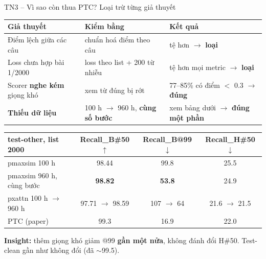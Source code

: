 \documentclass[aspectratio=169,xcolor=table]{beamer}
\newcommand{\bad}[1]{\textcolor{RiskRed}{\textbf{#1}}}
\newcommand{\good}[1]{\textcolor{GoodGreen}{\textbf{#1}}}
\newcommand{\ra}{$\rightarrow$}
\begin{document}
\begin{frame}{TN3 -- Vì sao còn thua PTC? Loại trừ từng giả thuyết}
\centering\footnotesize
\begin{tabular}{p{3.8cm}p{4.3cm}p{4.9cm}}
\toprule
Giả thuyết & Kiểm bằng & Kết quả\\
\midrule
Điểm lệch giữa các câu & chuẩn hoá điểm theo câu & tệ hơn \ra{} \bad{loại}\\
Loss chưa hợp bài 1/2000 & loss theo list + 200 từ nhiễu & tệ hơn mọi metric \ra{} \bad{loại}\\
Scorer \textbf{nghe kém} giọng khó & xem từ đúng bị rớt & 77--85\% có điểm $<$ 0.3 \ra{} \good{đúng}\\
\textbf{Thiếu dữ liệu} & 100 h \ra{} 960 h, \textbf{cùng số bước} & xem bảng dưới \ra{} \good{đúng một phần}\\
\bottomrule
\end{tabular}
\vspace{0.3cm}

\begin{tabular}{lccc}
\toprule
test-other, list 2000 & Recall\_B\#50 $\uparrow$ & Recall\_B@99 $\downarrow$ & Recall\_H\#50 $\downarrow$\\
\midrule
pmaxsim 100 h & 98.44 & 99.8 & 25.5\\
pmaxsim 960 h, cùng bước & \good{98.82} & \good{53.8} & 24.9\\
pxattn 100 h $\rightarrow$ 960 h & 97.71 \ra{} 98.59 & 107 \ra{} 64 & 21.6 \ra{} 21.5\\
PTC (paper) & 99.3 & 16.9 & 22.0\\
\bottomrule
\end{tabular}
\raggedright\vspace{0.15cm}

{\footnotesize \textbf{Insight:} thêm giọng khó giảm @99 \textbf{gần một nửa}, không đánh đổi H\#50. Test-clean gần như không đổi (đã $\sim$99.5).}
\end{frame}
\end{document}
